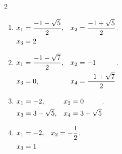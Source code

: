\documentclass[11pt,a4paper]{article}
\begin{document}
\begin{multicols}{2}
\begin{enumerate}
\item \(\displaystyle \begin{alignedat}[t]{2}x_{1}&=\frac{-1-\sqrt{5}}{2},\quad &x_{2}&=\frac{-1+\sqrt{5}}{2}\\x_{3}&=2\end{alignedat}\).
\item \(\displaystyle \begin{alignedat}[t]{2}x_{1}&=\frac{-1-\sqrt{7}}{2},\quad &x_{2}&=-1\\x_{3}&=0,\quad &x_{4}&=\frac{-1+\sqrt{7}}{2}\end{alignedat}\).
\item \(\displaystyle \begin{alignedat}[t]{2}x_{1}&=-2,\quad &x_{2}&=0\\x_{3}&=3-\sqrt{5},\quad &x_{4}&=3+\sqrt{5}\end{alignedat}\).
\item \(\displaystyle \begin{alignedat}[t]{2}x_{1}&=-2,\quad &x_{2}&=-\frac{1}{2}\\x_{3}&=1\end{alignedat}\).
\end{enumerate}
\end{multicols}
\endgroup
\clearpage
\end{document}
